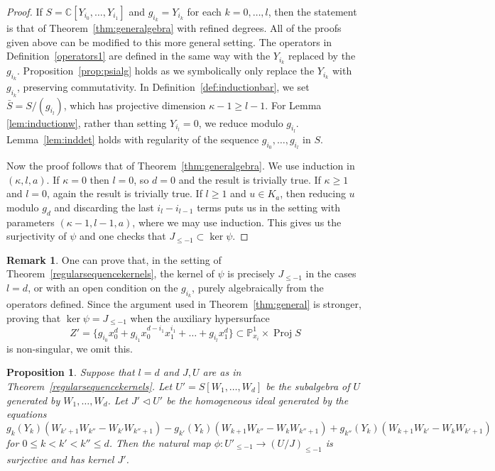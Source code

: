 \documentclass[a4paper,11pt]{amsart}
\theoremstyle{plain}
\newtheorem{proposition}[theorem]{Proposition}
\theoremstyle{definition}
\newtheorem{remark}[theorem]{Remark}
\newcommand{\C}{\mathbb{C}}
\newcommand{\p}{\mathbb{P}}
\DeclareMathOperator{\Proj}{Proj}
\begin{document}
\begin{proof}
    If $S = \C[Y_{i_0},\dots,Y_{i_1}]$ and $g_{i_k} = Y_{i_k}$ for each $k = 0,\dots, l$, then the statement is that of Theorem~\ref{thm:generalgebra} with refined degrees. All of the proofs given above can be modified to this more general setting. The operators in Definition~\ref{operators1} are defined in the same way with the $Y_{i_k}$ replaced by the $g_{i_k}$. Proposition~\ref{prop:psialg} holds as we symbolically only replace the $Y_{i_k}$ with $g_{i_k}$, preserving commutativity. In Definition~\ref{def:inductionbar}, we set $\bar S = S/(g_{i_l})$, which has projective dimension $\kappa -1 \geq l-1$. For Lemma \ref{lem:inductionw}, rather than setting $Y_{i_l} = 0$, we reduce modulo $g_{i_l}$. Lemma~\ref{lem:inddet} holds with regularity of the sequence $g_{i_0},\dots,g_{i_l}$ in $S$.

    Now the proof follows that of Theorem~\ref{thm:generalgebra}. We use induction in $(\kappa,l,a)$. If $\kappa = 0$ then $l = 0$, so $d = 0$ and the result is trivially true. If $\kappa \geq 1$ and $l =0$, again the result is trivially true. If $l \geq 1$ and $u \in K_a$, then reducing $u$ modulo $g_d$ and discarding the last $i_l - i_{l-1}$ terms puts us in the setting with parameters $(\kappa -1, l-1,a)$, where we may use induction. This gives us the surjectivity of $\psi$ and one checks that $J_{\leq -1} \subset \ker \psi$.
\end{proof}

\begin{remark}
    One can prove that, in the setting of Theorem~\ref{regularsequencekernels}, the kernel of $\psi$ is precisely $J_{\leq -1}$ in the cases $l=d$, or with an open condition on the $g_{i_k}$, purely algebraically from the operators defined. Since the argument used in Theorem~\ref{thm:general} is stronger, proving that $\ker \psi = J_{\leq -1}$ when the auxiliary hypersurface
    \[
    Z' = \{g_{i_0} x_0^d + g_{i_1} x_0^{d-i_1} x_1^{i_1} + \dots + g_{i_l} x_1^d \} \subset \p^1_{x_i} \times \Proj S
    \]
    is non-singular, we omit this.
\end{remark}

\begin{proposition}\label{prop:generalWideal}
    Suppose that $l=d$ and $J,U$ are as in Theorem~\ref{regularsequencekernels}. Let $U' = S[W_1,\dots,W_d]$ be the subalgebra of $U$ generated by $W_1,\dots,W_d$. Let $J' \lhd U'$ be the homogeneous ideal generated by the equations
    \[
    g_{k}(Y_k) (W_{k'+1} W_{k''} - W_{k'} W_{k''+1}) - g_{k'}(Y_k) (W_{k+1} W_{k''} - W_k W_{k''+1}) + g_{k''}(Y_k) (W_{k+1} W_{k'} - W_k W_{k'+1})
    \]
    for $0 \leq k < k' < k'' \leq d$. Then the natural map $\phi:U'_{\leq -1} \rightarrow (U/J)_{\leq -1} $ is surjective and has kernel $J'$.
\end{proposition}
\end{document}
